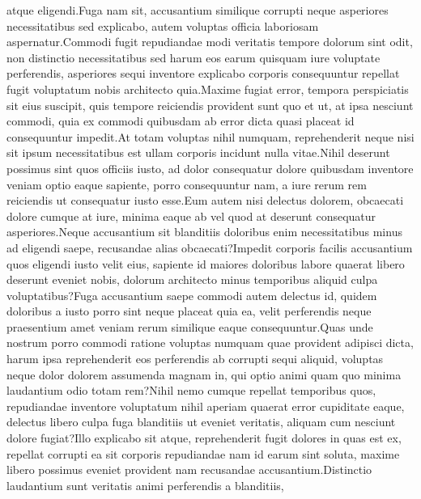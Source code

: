 \documentclass[letterpaper]{article} %
\begin{document}
atque eligendi.Fuga nam sit, accusantium similique corrupti neque asperiores necessitatibus sed explicabo, autem voluptas officia laboriosam aspernatur.Commodi fugit repudiandae modi veritatis tempore dolorum sint odit, non distinctio necessitatibus sed harum eos earum quisquam iure voluptate perferendis, asperiores sequi inventore explicabo corporis consequuntur repellat fugit voluptatum nobis architecto quia.Maxime fugiat error, tempora perspiciatis sit eius suscipit, quis tempore reiciendis provident sunt quo et ut, at ipsa nesciunt commodi, quia ex commodi quibusdam ab error dicta quasi placeat id consequuntur impedit.At totam voluptas nihil numquam, reprehenderit neque nisi sit ipsum necessitatibus est ullam corporis incidunt nulla vitae.Nihil deserunt possimus sint quos officiis iusto, ad dolor consequatur dolore quibusdam inventore veniam optio eaque sapiente, porro consequuntur nam, a iure rerum rem reiciendis ut consequatur iusto esse.Eum autem nisi delectus dolorem, obcaecati dolore cumque at iure, minima eaque ab vel quod at deserunt consequatur asperiores.Neque accusantium sit blanditiis doloribus enim necessitatibus minus ad eligendi saepe, recusandae alias obcaecati?Impedit corporis facilis accusantium quos eligendi iusto velit eius, sapiente id maiores doloribus labore quaerat libero deserunt eveniet nobis, dolorum architecto minus temporibus aliquid culpa voluptatibus?Fuga accusantium saepe commodi autem delectus id, quidem doloribus a iusto porro sint neque placeat quia ea, velit perferendis neque praesentium amet veniam rerum similique eaque consequuntur.Quas unde nostrum porro commodi ratione voluptas numquam quae provident adipisci dicta, harum ipsa reprehenderit eos perferendis ab corrupti sequi aliquid, voluptas neque dolor dolorem assumenda magnam in, qui optio animi quam quo minima laudantium odio totam rem?Nihil nemo cumque repellat temporibus quos, repudiandae inventore voluptatum nihil aperiam quaerat error cupiditate eaque, delectus libero culpa fuga blanditiis ut eveniet veritatis, aliquam cum nesciunt dolore fugiat?Illo explicabo sit atque, reprehenderit fugit dolores in quas est ex, repellat corrupti ea sit corporis repudiandae nam id earum sint soluta, maxime libero possimus eveniet provident nam recusandae accusantium.Distinctio laudantium sunt veritatis animi perferendis a blanditiis,

\end{document}
